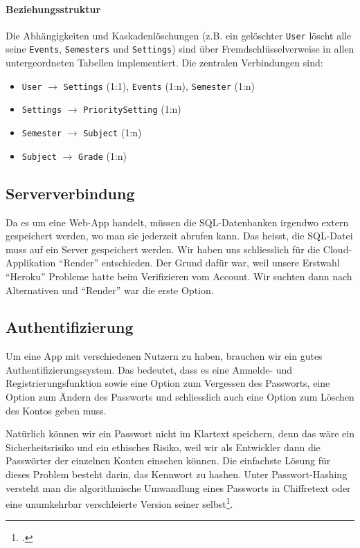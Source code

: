 \documentclass[12pt,a4paper]{report}
\begin{document}
\paragraph{Beziehungsstruktur}
Die Abhängigkeiten und Kaskadenlöschungen (z.B. ein gelöschter \texttt{User} löscht alle seine \texttt{Events}, \texttt{Semesters} und \texttt{Settings}) sind über Fremdschlüsselverweise in allen untergeordneten Tabellen implementiert. Die zentralen Verbindungen sind:
\begin{itemize}
    \item \texttt{User} $\to$ \texttt{Settings} (1:1), \texttt{Events} (1:n), \texttt{Semester} (1:n)
    \item \texttt{Settings} $\to$ \texttt{PrioritySetting} (1:n)
    \item \texttt{Semester} $\to$ \texttt{Subject} (1:n)
    \item \texttt{Subject} $\to$ \texttt{Grade} (1:n)
\end{itemize}

\subsection{Serververbindung}
Da es um eine Web-App handelt, müssen die SQL-Datenbanken irgendwo extern gespeichert werden, wo man sie jederzeit abrufen kann. Das heisst, die SQL-Datei muss auf ein Server gespeichert werden. Wir haben uns schliesslich für die Cloud-Applikation ``Render'' entschieden. Der Grund dafür war, weil unsere Erstwahl ``Heroku'' Probleme hatte beim Verifizieren vom Account. Wir suchten dann nach Alternativen und ``Render'' war die erste Option. 

\subsection{Authentifizierung}
Um eine App mit verschiedenen Nutzern zu haben, brauchen wir ein gutes Authentifizierungssystem. Das bedeutet, dass es eine Anmelde- und Registrierungsfunktion sowie eine Option zum Vergessen des Passworts, eine Option zum Ändern des Passworts und schliesslich auch eine Option zum Löschen des Kontos geben muss. 

Natürlich können wir ein Passwort nicht im Klartext speichern, denn das wäre ein Sicherheitsrisiko und ein ethisches Risiko, weil wir als Entwickler dann die Passwörter der einzelnen Konten einsehen können. Die einfachste Lösung für dieses Problem besteht darin, das Kennwort zu hashen. Unter Passwort-Hashing versteht man die algorithmische Umwandlung eines Passworts in Chiffretext oder eine unumkehrbar verschleierte Version seiner selbst\footcite{password_hashing}. 
\end{document}

